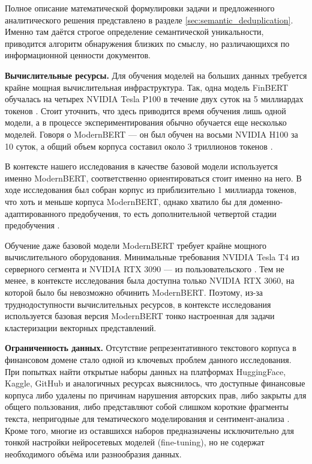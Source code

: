 Полное описание математической формулировки задачи и предложенного аналитического решения представлено
в разделе \ref{sec:semantic_deduplication}. Именно там даётся строгое определение семантической уникальности,
приводится алгоритм обнаружения близких по смыслу, но различающихся по информационной ценности документов.

\textbf{Вычислительные ресурсы.} Для обучения моделей на больших данных требуется крайне мощная вычислительная
инфраструктура. Так, одна модель FinBERT обучалась на четырех NVIDIA Tesla P100 в течение двух суток на 5 миллиардах
токенов \parencite{Yang2020FinBERT}. Стоит уточнить, что здесь приводится время обучения лишь одной модели, а в процессе
экспериментирования обычно обучается еще несколько моделей. Говоря о ModernBERT --- он был обучен на восьми NVIDIA
H100 за 10 суток, а общий объем корпуса составил около 3 триллионов токенов \parencite{Warner2024ModernBERT}.

В контексте нашего исследования в качестве базовой модели используется именно ModernBERT, соответственно ориентироваться
стоит именно на него. В ходе исследования был собран корпус из приблизительно 1 миллиарда токенов, что хоть и меньше
корпуса ModernBERT, однако хватило бы для доменно-адаптированного предобучения, то есть дополнительной четвертой
стадии предобучения \parencite{Warner2024ModernBERT, gururangan2020DAPT}.

Обучение даже базовой модели ModernBERT требует крайне мощного вычислительного оборудования. Минимальные требования
NVIDIA Tesla T4 из серверного сегмента и NVIDIA RTX 3090 --- из пользовательского \parencite{Warner2024ModernBERT}. Тем не менее,
в контексте исследования была доступна только NVIDIA RTX 3060, на которой было бы невозможно обчинить ModernBERT.
Поэтому, из-за труднодоступности вычислительных ресурсов, в контексте исследования используется базовая версия
ModernBERT тонко настроенная для задачи кластеризации векторных представлений.

\textbf{Ограниченность данных.} Отсутствие репрезентативного текстового корпуса в финансовом домене стало одной
из ключевых проблем данного исследования. При попытках найти открытые наборы данных на платформах HuggingFace,
Kaggle, GitHub и аналогичных ресурсах выяснилось, что доступные финансовые корпуса либо удалены по причинам
нарушения авторских прав, либо закрыты для общего пользования, либо представляют собой слишком короткие фрагменты
текста, непригодные для тематического моделирования и сентимент-анализа
\parencite{FiQA2018SA, Malo2014FPB, daudert2022multi, FSA2020problems, wiebe2005annotating}. Кроме того, многие
из оставшихся наборов предназначены исключительно для тонкой настройки нейросетевых моделей (fine-tuning), но
не содержат  необходимого объёма или разнообразия данных.

